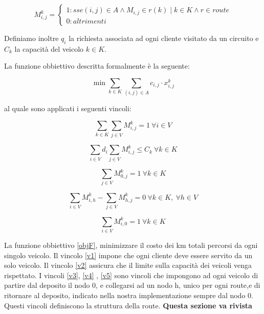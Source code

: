 \documentclass[]{article}
\begin{document}
\[M_{i,j}^k = \left\{
\begin{array}{lr}
1 :sse (i,j) \in A \wedge M_{i,j} \in  r(k) \mid k \in K \wedge r \in route\\
0 :altrimenti
\end{array}
\right.
\]

Definiamo inoltre \emph{$q_{i}$} la richiesta associata ad ogni cliente visitato da un circuito e \emph{$C_{k}$} la capacità del veicolo \emph{$k \in K$}.

La funzione obbiettivo descritta formalmente è la seguente:

\begin{equation} \label{objF}
\min \sum_{k \in K} \sum_{(i,j) \in A} c_{i,j} \cdot x_{i,j}^k 
\end{equation}



al quale sono applicati i seguenti vincoli:

\begin{equation} \label{v1}
 \sum_{k \in K} \sum_{j \in V} M_{i,j}^k = 1 \ \forall i \in V
\end{equation}

\begin{equation} \label{v2}
\sum_{i \in V} d_{i} \sum_{j \in V} M_{i,j}^k \leq C_{k} \ \forall k \in K
\end{equation}

\begin{equation} \label{v3}
\sum_{j \in V} M_{0,j}^k = 1 \ \forall k \in K
\end{equation}

\begin{equation} \label{v4}
\sum_{i \in V} M_{i,h}^k - \sum_{j \in V} M_{h,j}^k = 0 \ \forall k \in K ,\  \forall h \in V
\end{equation}

\begin{equation} \label{v5}
\sum_{i \in V} M_{i,0}^k = 1 \ \forall k \in K
\end{equation}



La funzione obbiettivo \ref{objF}, minimizzare il costo dei km totali percorsi da ogni singolo veicolo.
Il vincolo \ref{v1} impone che ogni cliente deve essere servito da un solo veicolo.
Il vincolo \ref{v2} assicura che il limite sulla capacità dei veicoli venga rispettato.
I vincoli \ref{v3}, \ref{v4} , \ref{v5} sono vincoli che impongono ad ogni veicolo di partire dal deposito il nodo 0, e collegarsi ad un nodo h, unico per ogni route,e di ritornare al deposito, indicato nella nostra implementazione sempre dal nodo 0. Questi vincoli definiscono la struttura della route.
\textbf{Questa sezione va rivista }
\end{document}
